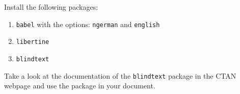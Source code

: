 \documentclass[10pt, paper=a4, abstracton]{scrartcl}
\begin{document}
Install the following packages:

\begin{enumerate}
	\item \texttt{babel} with the options: \texttt{ngerman} and \texttt{english}
	
	\item \texttt{libertine}
	
	\item \texttt{blindtext}
\end{enumerate}

Take a look at the documentation of the \texttt{blindtext} package in the CTAN webpage and use the package in your document.


\blindtext
\end{document}
